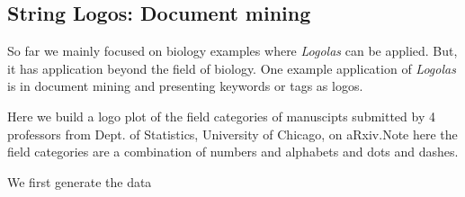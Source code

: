 \documentclass[12pt]{article}\usepackage[]{graphicx}\usepackage[usenames,dvipsnames]{color}
\newcommand{\Logolas}{\textit{Logolas}}
\begin{document}
\newpage

\subsection{String Logos:  Document mining}

So far we mainly focused on biology examples where \Logolas{} can be applied. But,
it has application beyond the field of biology. One example application of \Logolas{} is in document mining and presenting keywords or tags as logos.

Here we build a logo plot of the field categories of manuscipts submitted by 4
professors from Dept. of Statistics, University of Chicago, on aRxiv.Note here the field categories are a combination of numbers and alphabets and dots and dashes.

We first generate the data
\end{document}

